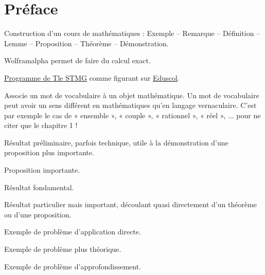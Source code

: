 
\chapter*{Préface}

Construction d'un cours de mathématiques : Exemple -- Remarque -- Définition -- Lemme -- Proposition -- Théorème -- Démonstration.

Wolframalpha permet de faire du calcul exact.

\href{https://eduscol.education.fr/document/24562/download}{Programme de Tle STMG} comme figurant sur
\href{https://eduscol.education.fr/1723/programmes-et-ressources-en-mathematiques-voie-gt}{Eduscol}.

\begin{definition*}
Associe un mot de vocabulaire à un objet mathématique.
Un mot de vocabulaire peut avoir un sens différent en mathématiques qu'en langage vernaculaire.
C'est par exemple le cas de « ensemble », « couple », « rationnel », « réel », ... pour ne citer que le chapitre 1 !
\end{definition*}

\begin{lemme*}
	Résultat préliminaire, parfois technique, utile à la démonstration d'une proposition plus importante.
\end{lemme*}

\begin{proposition*}
	Proposition importante.
\end{proposition*}

\begin{theorem*}
	Résultat fondamental.
\end{theorem*}

\begin{corollaire*}
	Résultat particulier mais important, découlant quasi directement d'un théorème ou d'une proposition.
\end{corollaire*}


\begin{Exercise}[counter=preface]
	Exemple de problème d'application directe.
\end{Exercise}
\begin{Exercise}[difficulty=1, counter=preface]
	Exemple de problème plus théorique.
\end{Exercise}
\begin{Exercise}[difficulty=2, counter=preface]
	Exemple de problème d'approfondissement.
\end{Exercise}